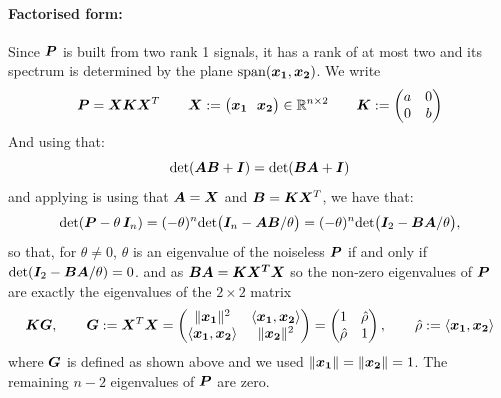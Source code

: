 \documentclass[11pt]{article}
\begin{document}
\paragraph{Factorised form:}
Since $\bm{P}$ is built from two rank 1 signals, it has a rank of at most two and its spectrum is determined by the plane $\operatorname{span}(\bm{x_1},\bm{x_2})$. We write
\begin{equation}
    \bm{P} = \bm{X} \bm{K} \bm{X}^T
    \qquad
    \bm{X} := \big( \bm{x_1} \ \ \bm{x_2} \big) \in \mathbb{R}^{n\times 2}
    \qquad
    \bm{K} := \begin{pmatrix} a & 0 \\ 0 & b \end{pmatrix}
    \label{eq:P-factor}
\end{equation}
And using that:
\begin{equation}
    \mathrm{det}(\bm{AB} + \bm{I}) = \mathrm{det}(\bm{BA} + \bm{I}) 
\end{equation}
and applying is using that $\bm{A} = \bm{X}$ and $\bm{B} = \bm{K}\bm{X}^T$, we have that:
\begin{equation}
    \mathrm{det}(\bm{P} - \theta\, \bm{I}_n) = (-\theta)^n \mathrm{det}\big(\bm{I}_n - \bm{AB}/\theta\big)
    = (-\theta)^n \mathrm{det}\big(\bm{I}_2 - \bm{BA}/\theta\big) ,
\end{equation}
so that, for $\theta \neq 0$, $\theta$ is an eigenvalue of the noiseless $\bm{P}$ if and only if $\mathrm{det}(\bm{I}_2 - \bm{BA}/\theta) = 0$.
and as $\bm{BA} = \bm{KX^TX} $ so the non-zero eigenvalues of $\bm{P}$ are exactly the eigenvalues of the $2\times 2$ matrix
\begin{equation}
    \bm{K} \bm{G},
    \qquad
    \bm{G} := \bm{X}^T \bm{X}
    = \begin{pmatrix} \|\bm{x_1}\|^2 & \langle \bm{x_1},\bm{x_2}\rangle \\ \langle \bm{x_1},\bm{x_2}\rangle & \|\bm{x_2}\|^2 \end{pmatrix}
    = \begin{pmatrix} 1 & \hat\rho \\ \hat\rho & 1 \end{pmatrix},
    \qquad
    \hat\rho := \langle \bm{x_1},\bm{x_2}\rangle
    \label{eq:gram}
\end{equation}
where $\bm{G}$ is defined as shown above and we used $\|\bm{x_1}\| = \|\bm{x_2}\| = 1$. The remaining $n-2$ eigenvalues of $\bm{P}$ are zero.
\end{document}
